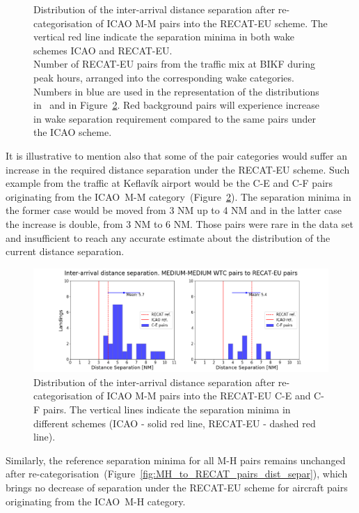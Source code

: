 \begin{figure}[h]
    \caption[Inter-arrival distance separation of ICAO M-M pairs into the RECAT-EU scheme]{\protect{} Distribution of the inter-arrival distance separation after re-categorisation of ICAO M-M pairs into the RECAT-EU scheme. The vertical red line indicate the separation minima in both wake schemes ICAO and RECAT-EU.\\ \protect{} Number of RECAT-EU pairs from the traffic mix at BIKF during peak hours, arranged into the corresponding wake categories. Numbers in blue are used in the representation of the distributions in~\protect{} and in Figure~\ref{fig:MM_to_CE_and_CF_pairs_dist_separ}. Red background pairs will experience increase in wake separation requirement compared to the same pairs under the ICAO scheme.}
    \label{fig:MM_to_RECAT_pairs_dist_separ}
\end{figure}
\clearpage
It is illustrative to mention also that some of the pair categories would suffer an increase in the required distance separation under the RECAT-EU scheme. Such example from the traffic at Keflavík airport would be the C-E and C-F pairs originating from the ICAO~M-M category~(Figure~\ref{fig:MM_to_CE_and_CF_pairs_dist_separ}). The separation minima in the former case would be moved from 3 NM up to 4 NM and in the latter case the increase is double, from 3 NM to 6 NM. Those pairs were rare in the data set and insufficient to reach any accurate estimate about the distribution of the current distance separation. 

\begin{figure}[h]
    \centering
    \includegraphics[width=1\textwidth]{graphics/fig_MM_to_CE_and_CF_pairs_dist_separ.png}
    \caption[Inter-arrival distance separation of ICAO M-M pairs into the RECAT-EU C-F and D-F pairs]{Distribution of the inter-arrival distance separation after re-categorisation of ICAO M-M pairs into the RECAT-EU C-E and C-F pairs. The vertical lines indicate the separation minima in different schemes (ICAO - solid red line, RECAT-EU - dashed red line).}
    \label{fig:MM_to_CE_and_CF_pairs_dist_separ}
\end{figure}
\clearpage
Similarly, the reference separation minima for all M-H pairs remains unchanged after re-categorisation~(Figure~\ref{fig:MH_to_RECAT_pairs_dist_separ}), which brings no decrease of separation under the RECAT-EU scheme for aircraft pairs originating from the ICAO~M-H category. 


